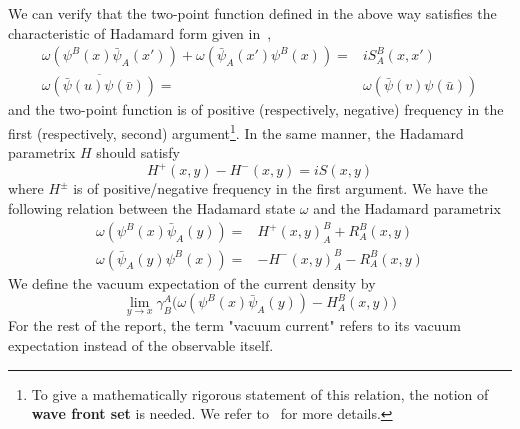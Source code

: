 We can verify that the two-point function defined in the above way satisfies the characteristic of Hadamard form given in~\cite{Radzikowski1996}, \ie
\begin{equation}\label{vacuum-hadamardcond}
\begin{split}
\omega(\psi^B(x)\bar{\psi}_A(x')) + \omega(\bar{\psi}_A(x')\psi^B(x)) = &
iS^B_A(x,x') \\
\overline{\omega(\bar{\psi}(u)\psi(\bar{v}))} = & \omega(\bar{\psi}(v)\psi(\bar{u}))
\end{split}
\end{equation}
and the two-point function is of positive (respectively, negative) frequency in the first (respectively, second) argument\footnote{
To give a mathematically rigorous statement of this relation, 
the notion of \textbf{wave front set} is needed. 
We refer to~\cite{Radzikowski1996} for more details.
}.
In the same manner, the Hadamard parametrix $H$ should satisfy
\begin{equation}\label{intro-hh}
H^+(x,y) - H^-(x,y) = i S(x,y)
\end{equation}
where $H^\pm$ is of positive/negative frequency in the first argument.
We have the following relation between the Hadamard state $\omega$ and the Hadamard parametrix
\begin{equation}\label{intro-renormalization}
\begin{split}
\omega(\psi^B(x)\bar{\psi}_A(y)) = & H^+(x,y)^B_A + R^B_A(x,y) \\
\omega(\bar{\psi}_A(y)\psi^B(x)) = &- H^-(x,y)^B_A - R^B_A(x,y)
\end{split}
\end{equation}
We define the vacuum expectation of the current density by 
\begin{equation}\label{vacuum-currentexpression}
\lim_{y \rightarrow x} \gamma^A_B \big(
\omega(\psi^B(x)\bar{\psi}_A(y)) - H^B_A (x, y)\big)
\end{equation}
For the rest of the report, the term "vacuum current" refers to its vacuum expectation instead of the observable itself. 
%
